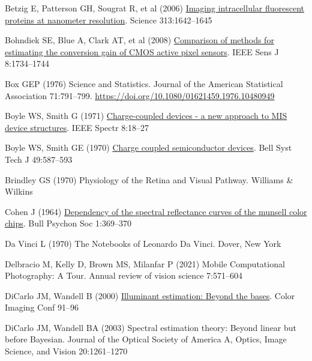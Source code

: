 \documentclass[
  letterpaper,
]{book}
\newlength{\cslhangindent}
\newenvironment{CSLReferences}[2] %
 {\begin{list}{}{%
  \setlength{\itemindent}{0pt}
  \setlength{\leftmargin}{0pt}
  \setlength{\parsep}{0pt}
  \ifodd #1
   \setlength{\leftmargin}{\cslhangindent}
   \setlength{\itemindent}{-1\cslhangindent}
  \fi
  \setlength{\itemsep}{#2\baselineskip}}}
 {\end{list}}
\begin{document}
\begin{CSLReferences}{1}{1}
Betzig E, Patterson GH, Sougrat R, et al (2006)
\href{http://dx.doi.org/10.1126/science.1127344}{Imaging intracellular
fluorescent proteins at nanometer resolution}. Science 313:1642--1645

Bohndiek SE, Blue A, Clark AT, et al (2008)
\href{http://dx.doi.org/10.1109/jsen.2008.2004296}{Comparison of methods
for estimating the conversion gain of {CMOS} active pixel sensors}. IEEE
Sens J 8:1734--1744

Box GEP (1976) Science and {Statistics}. Journal of the American
Statistical Association 71:791--799.
\url{https://doi.org/10.1080/01621459.1976.10480949}

Boyle WS, Smith G (1971)
\href{https://ieeexplore.ieee.org/abstract/document/5218282/}{Charge-coupled
devices - a new approach to {MIS} device structures}. IEEE Spectr
8:18--27

Boyle WS, Smith GE (1970)
\href{https://onlinelibrary.wiley.com/doi/abs/10.1002/j.1538-7305.1970.tb01790.x}{Charge
coupled semiconductor devices}. Bell Syst Tech J 49:587--593

Brindley GS (1970) Physiology of the {Retina} and {Visual Pathway}.
Williams \& Wilkins

Cohen J (1964)
\href{https://link.springer.com/article/10.3758/BF03342963}{Dependency
of the spectral reflectance curves of the munsell color chips}. Bull
Psychon Soc 1:369--370

Da Vinci L (1970) The {Notebooks} of {Leonardo Da Vinci}. Dover, New
York

Delbracio M, Kelly D, Brown MS, Milanfar P (2021) Mobile {Computational
Photography}: {A Tour}. Annual review of vision science 7:571--604

DiCarlo JM, Wandell B (2000)
\href{https://library.imaging.org/cic/articles/8/1/art00018}{Illuminant
estimation: Beyond the bases}. Color Imaging Conf 91--96

DiCarlo JM, Wandell BA (2003) Spectral estimation theory: {Beyond}
linear but before {Bayesian}. Journal of the Optical Society of America
A, Optics, Image Science, and Vision 20:1261--1270


\end{CSLReferences}
\end{document}

